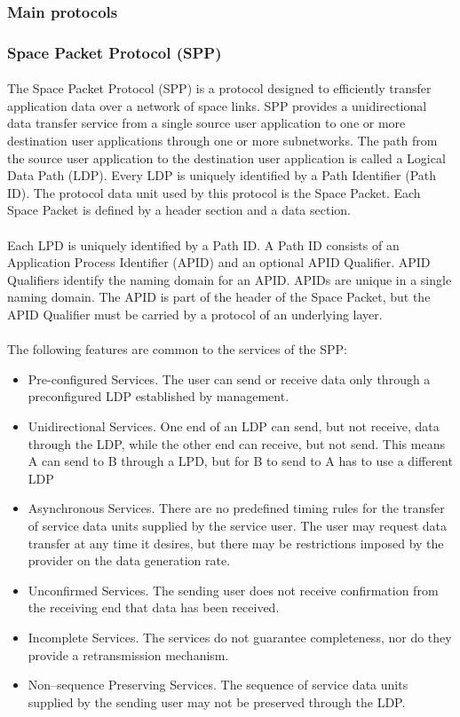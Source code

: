 \subsubsection{Main protocols}

\subsubsection*{Space Packet Protocol (SPP)\cite{SPP}}
\paragraph{}The Space Packet Protocol (SPP) is a protocol designed to efficiently transfer application data over a network of space links. SPP provides a unidirectional data transfer service from a single source user application to one or more destination user applications through one or more subnetworks. The path from the source user application to the destination user application is called a Logical Data Path (LDP). Every LDP is uniquely identified by a Path Identifier (Path ID). The protocol data unit used by this protocol is the Space Packet. Each Space Packet is defined by a header section and a data section.
\paragraph{}Each LPD is uniquely identified by a Path ID. A Path ID consists of an Application Process Identifier (APID) and an optional APID Qualifier. APID Qualifiers identify the naming domain for an APID. APIDs are unique in a single naming domain. The APID is part of the header of the Space Packet, but the APID Qualifier must be carried by a protocol of an underlying layer.
\paragraph{}The following features are common to the services of the SPP:
\begin{itemize}
\item Pre-configured Services. The user can send or receive data only through a preconfigured LDP established by management.
\item Unidirectional Services. One end of an LDP can send, but not receive, data through the LDP, while the other end can receive, but not send. This means A can send to B through a LPD, but for B to send to A has to use a different LDP
\item Asynchronous Services. There are no predefined timing rules for the transfer of service data units supplied by the service user. The user may request data transfer at any time it desires, but there may be restrictions imposed by the provider on the data generation rate.
\item Unconfirmed Services. The sending user does not receive confirmation from the receiving end that data has been received.
\item Incomplete Services. The services do not guarantee completeness, nor do they provide a retransmission mechanism.
\item Non–sequence Preserving Services. The sequence of service data units supplied by the sending user may not be preserved through the LDP.
\end{itemize}

